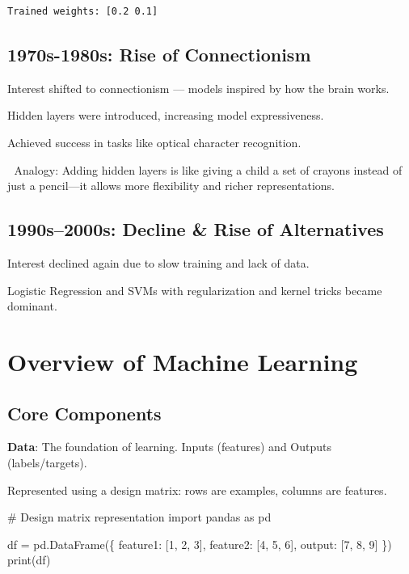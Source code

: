 \documentclass[
  letterpaper,
  DIV=11,
  numbers=noendperiod]{scrreprt}
\newenvironment{Shaded}{\begin{snugshade}}{\end{snugshade}}
\newcommand{\BuiltInTok}[1]{\textcolor[rgb]{0.00,0.23,0.31}{#1}}
\newcommand{\CommentTok}[1]{\textcolor[rgb]{0.37,0.37,0.37}{#1}}
\newcommand{\DecValTok}[1]{\textcolor[rgb]{0.68,0.00,0.00}{#1}}
\newcommand{\ImportTok}[1]{\textcolor[rgb]{0.00,0.46,0.62}{#1}}
\newcommand{\NormalTok}[1]{\textcolor[rgb]{0.00,0.23,0.31}{#1}}
\newcommand{\OperatorTok}[1]{\textcolor[rgb]{0.37,0.37,0.37}{#1}}
\newcommand{\StringTok}[1]{\textcolor[rgb]{0.13,0.47,0.30}{#1}}
\begin{document}
\begin{verbatim}
Trained weights: [0.2 0.1]
\end{verbatim}

\subsection{1970s-1980s: Rise of
Connectionism}\label{s-1980s-rise-of-connectionism}

Interest shifted to connectionism --- models inspired by how the brain
works.

Hidden layers were introduced, increasing model expressiveness.

Achieved success in tasks like optical character recognition.

📌 Analogy: Adding hidden layers is like giving a child a set of crayons
instead of just a pencil---it allows more flexibility and richer
representations.

\subsection{1990s--2000s: Decline \& Rise of
Alternatives}\label{s2000s-decline-rise-of-alternatives}

Interest declined again due to slow training and lack of data.

Logistic Regression and SVMs with regularization and kernel tricks
became dominant.

\section{Overview of Machine
Learning}\label{overview-of-machine-learning}

\subsection{Core Components}\label{core-components}

\textbf{Data}: The foundation of learning. Inputs (features) and Outputs
(labels/targets).

Represented using a design matrix: rows are examples, columns are
features.

\begin{Shaded}
\begin{Highlighting}[]
\CommentTok{\# Design matrix representation}
\ImportTok{import}\NormalTok{ pandas }\ImportTok{as}\NormalTok{ pd}

\NormalTok{df }\OperatorTok{=}\NormalTok{ pd.DataFrame(\{}
    \StringTok{\textquotesingle{}feature1\textquotesingle{}}\NormalTok{: [}\DecValTok{1}\NormalTok{, }\DecValTok{2}\NormalTok{, }\DecValTok{3}\NormalTok{],}
    \StringTok{\textquotesingle{}feature2\textquotesingle{}}\NormalTok{: [}\DecValTok{4}\NormalTok{, }\DecValTok{5}\NormalTok{, }\DecValTok{6}\NormalTok{],}
    \StringTok{\textquotesingle{}output\textquotesingle{}}\NormalTok{: [}\DecValTok{7}\NormalTok{, }\DecValTok{8}\NormalTok{, }\DecValTok{9}\NormalTok{]}
\NormalTok{\})}
\BuiltInTok{print}\NormalTok{(df)}
\end{Highlighting}
\end{Shaded}
\end{document}
